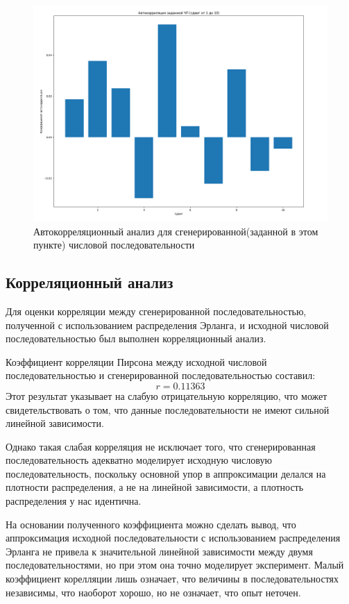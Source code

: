 \begin{figure}[H]
	\centering
	\includegraphics[width=1\textwidth]{../data/auto_corellation_random-2.png}
	\caption{Автокорреляционный анализ для сгенерированной(заданной в этом пункте) числовой последовательности}
\end{figure}

\subsection{Корреляционный анализ}
Для оценки корреляции между сгенерированной последовательностью, полученной с использованием распределения Эрланга, и исходной числовой последовательностью был выполнен корреляционный анализ.

Коэффициент корреляции Пирсона между исходной числовой последовательностью и сгенерированной последовательностью составил:
\[
	r = 0.11363
\]
Этот результат указывает на слабую отрицательную корреляцию, что может свидетельствовать о том, что данные последовательности не имеют сильной линейной зависимости.

Однако такая слабая корреляция не исключает того, что сгенерированная последовательность адекватно моделирует исходную числовую последовательность, поскольку основной упор в аппроксимации делался на плотности распределения, а не на линейной зависимости, а плотность распределения у нас идентична.

На основании полученного коэффициента можно сделать вывод, что аппроксимация исходной последовательности с использованием распределения Эрланга не привела к значительной линейной зависимости между двумя последовательностями, но при этом она точно моделирует эксперимент. Малый коэффициент корелляции лишь означает, что величины в последовательностях независимы, что наоборот хорошо, но не означает, что опыт неточен.

